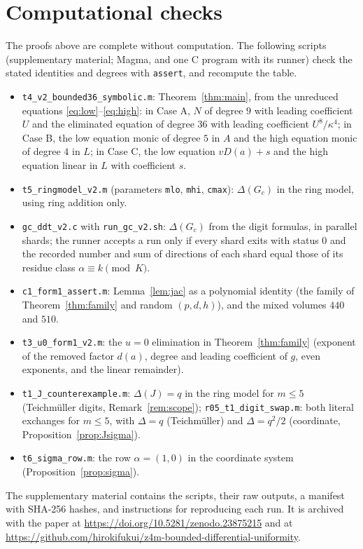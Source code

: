 \documentclass[11pt]{amsart}
\theoremstyle{definition}
\begin{document}
\appendix
\section{Computational checks}\label{app:cert}
The proofs above are complete without computation. The following scripts (supplementary material; Magma, and one C program with its runner) check the stated
identities and degrees with \texttt{assert}, and recompute the table.
\begin{itemize}
\item \texttt{t4\_v2\_bounded36\_symbolic.m}: Theorem~\ref{thm:main}, from the unreduced equations \eqref{eq:low}--\eqref{eq:high}:
in Case A, $N$ of degree $9$ with leading coefficient $U$ and the eliminated equation of degree $36$ with leading coefficient
$U^8/\kappa^4$; in Case B, the low equation monic of degree $5$ in $A$ and the high equation monic of degree $4$ in $L$; in Case C,
the low equation $vD(a)+s$ and the high equation linear in $L$ with coefficient $s$.
\item \texttt{t5\_ringmodel\_v2.m} (parameters \texttt{mlo}, \texttt{mhi}, \texttt{cmax}): $\Delta(G_c)$ in the ring model, using ring
addition only.
\item \texttt{gc\_ddt\_v2.c} with \texttt{run\_gc\_v2.sh}: $\Delta(G_c)$ from the digit formulas, in parallel shards; the runner accepts a
run only if every shard exits with status $0$ and the recorded number and sum of directions of each shard equal those of its residue
class $\alpha\equiv k\pmod K$.
\item \texttt{c1\_form1\_assert.m}: Lemma~\ref{lem:jac} as a polynomial identity (the family of Theorem~\ref{thm:family} and random
$(p,d,h)$), and the mixed volumes $440$ and $510$.
\item \texttt{t3\_u0\_form1\_v2.m}: the $u=0$ elimination in Theorem~\ref{thm:family} (exponent of the removed factor $d(a)$, degree and
leading coefficient of $g$, even exponents, and the linear remainder).
\item \texttt{t1\_J\_counterexample.m}: $\Delta(J)=q$ in the ring model for $m\le5$ (Teichm\"uller digits, Remark~\ref{rem:scope});
\texttt{r05\_t1\_digit\_swap.m}: both literal exchanges for $m\le5$, with $\Delta=q$ (Teichm\"uller) and $\Delta=q^2/2$ (coordinate,
Proposition~\ref{prop:Jsigma}).
\item \texttt{t6\_sigma\_row.m}: the row $\alpha=(1,0)$ in the coordinate system (Proposition~\ref{prop:sigma}).
\end{itemize}
The supplementary material contains the scripts, their raw outputs, a manifest with SHA-256 hashes, and instructions for
reproducing each run. It is archived with the paper at \url{https://doi.org/10.5281/zenodo.23875215} and at\\
\url{https://github.com/hirokifukui/z4m-bounded-differential-uniformity}.
\end{document}
